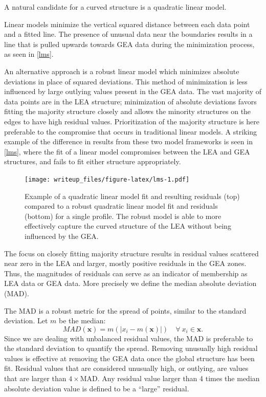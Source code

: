 \documentclass[]{article}
\begin{document}
A natural candidate for a curved structure is a quadratic linear model.

{\color{orange}{write the model out in math notation - that will give you a way to talk about the difference in fitting in a less abstract way.}}

Linear models minimize the vertical squared distance between each data
point and a fitted line.
{\color{orange}{the following line needs to go into the description of the previous figure. This figure already looks at the difference by using a robust method}}
The presence of unusual data near the boundaries results in a line that
is pulled upwards towards GEA data during the minimization process, as
seen in \autoref{lms}.

An alternative approach is a robust linear model which minimizes
absolute deviations in place of squared deviations. This method of
minimization is less influenced by large outlying values present in the
GEA data. The vast majority of data points are in the LEA structure;
minimization of absolute deviations favors fitting the majority
structure closely and allows the minority structures on the edges to
have high residual values. Prioritization of the majority structure is
here preferable to the compromise that occurs in traditional linear
models. A striking example of the difference in results from these two
model frameworks is seen in \autoref{lms}, where the fit of a linear
model compromises between the LEA and GEA structures, and fails to fit
either structure appropriately.

\begin{figure}
\centering
\texttt{[image: writeup\_files/figure-latex/lms-1.pdf]}
\caption{\label{lms}Example of a quadratic linear model fit and
resulting residuals (top) compared to a robust quadratic linear model
fit and residuals (bottom) for a single profile. The robust model is
able to more effectively capture the curved structure of the LEA without
being influenced by the GEA.}
\end{figure}

The focus on closely fitting majority structure results in residual
values scattered near zero in the LEA and larger, mostly positive
residuals in the GEA zones. Thus, the magnitudes of residuals can serve
as an indicator of membership as LEA data or GEA data. More precisely we
define the median absolute deviation (MAD).

The MAD is a robust metric for the spread of points, similar to the
standard deviation. Let \(m\) be the median:\\
\[ MAD(\mathbf{x}) = m(|x_i- m(\mathbf{x})|) \quad \forall\ x_i \in \mathbf{x}.\]
{\color{orange}{Reduce the next paragraph to 2 sentences}} Since we are
dealing with unbalanced residual values, the MAD is preferable to the
standard deviation to quantify the spread. Removing unusually high
residual values is effective at removing the GEA data once the global
structure has been fit. Residual values that are considered unusually
high, or outlying, are values that are larger than \(4 \times\)MAD. Any
residual value larger than 4 times the median absolute deviation value
is defined to be a ``large'' residual.
\end{document}
